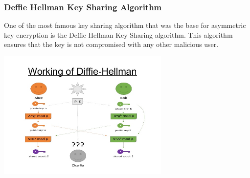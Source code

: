 \documentclass[conference]{IEEEtran}
\begin{document}
\subsubsection{Deffie Hellman Key Sharing Algorithm}
\begin{flushleft}
One of the most famous key sharing algorithm that was the base for asymmetric key encryption is the Deffie Hellman Key Sharing algorithm. This algorithm ensures that the key is not compromised with any other malicious user.
\linebreak

\includegraphics[width=8.5cm]{hellman}
\end{flushleft}
\end{document}
